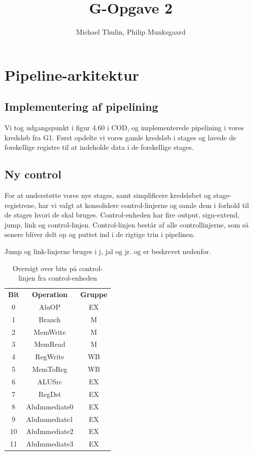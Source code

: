 \documentclass [10pt,a4paper]{article}
\title{G-Opgave 2}
\author{Michael Thulin, Philip Munksgaard}
\begin{document}
\maketitle

\section{Pipeline-arkitektur}

\subsection{Implementering af pipelining}

Vi tog udgangspunkt i figur 4.60 i COD, og implementerede pipelining i
vores kredsløb fra G1. Først opdelte vi vores gamle kredsløb i stages og lavede de
forskellige registre til at indeholde data i de forskellige
stages. 

\subsection{Ny control}

For at understøtte vores nye stages, samt simplificere kredsløbet og
stage-registrene, har vi valgt at konsolidere control-linjerne og
samle dem i forhold til de stages hvori de skal
bruges. Control-enheden har fire output, sign-extend, jump, link og
control-linjen. \newline
Control-linjen består af alle controllinjerne, som så senere bliver
delt op og puttet ind i de rigtige trin i pipelinen.

Jump og link-linjerne bruges i j, jal og jr. og er beskrevet nedenfor.

\begin{table}
  \centering
  \begin{tabular}{ c | c | c }
    \textbf{Bit} & \textbf{Operation} & \textbf{Gruppe} \\
    0 & AluOP & EX \\
    1 & Branch & M \\
    2 & MemWrite & M \\
    3 & MemRead & M \\
    4 & RegWrite & WB \\
    5 & MemToReg & WB \\
    6 & ALUSrc & EX \\
    7 & RegDst & EX \\
    8 & AluImmediate0 & EX \\
    9 & AluImmediate1 & EX \\
    10 & AluImmediate2 & EX \\
    11 & AluImmediate3 & EX \\
  \end{tabular}
  \caption{Oversigt over bits på control-linjen fra control-enheden}
\end{table}
\end{document}
